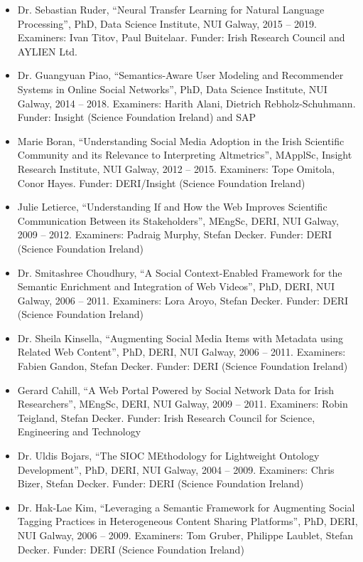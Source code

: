 \documentclass[10pt,a4paper]{res} %
\begin{document}
\begin{resume}
\begin{itemize} \itemsep -2pt
\item Dr. Sebastian Ruder, ``Neural Transfer Learning for Natural Language Processing'', PhD, Data Science Institute, NUI Galway, 2015 -- 2019. Examiners: Ivan Titov, Paul Buitelaar. Funder: Irish Research Council and AYLIEN Ltd. %
\item Dr. Guangyuan Piao, ``Semantics-Aware User Modeling and Recommender Systems in Online Social Networks'', PhD, Data Science Institute, NUI Galway, 2014 -- 2018. Examiners: Harith Alani, Dietrich Rebholz-Schuhmann. Funder: Insight (Science Foundation Ireland) and SAP %
\item Marie Boran, ``Understanding Social Media Adoption in the Irish Scientific Community and its Relevance to Interpreting Altmetrics'', MApplSc, Insight Research Institute, NUI Galway, 2012 -- 2015. Examiners: Tope Omitola, Conor Hayes. Funder: DERI/Insight (Science Foundation Ireland)
\item Julie Letierce, ``Understanding If and How the Web Improves Scientific Communication Between its Stakeholders'', MEngSc, DERI, NUI Galway, 2009 -- 2012. Examiners: Padraig Murphy, Stefan Decker. Funder: DERI (Science Foundation Ireland)
\item Dr. Smitashree Choudhury, ``A Social Context-Enabled Framework for the Semantic Enrichment and Integration of Web Videos'', PhD, DERI, NUI Galway, 2006 -- 2011. Examiners: Lora Aroyo, Stefan Decker. Funder: DERI (Science Foundation Ireland) %
\item Dr. Sheila Kinsella, ``Augmenting Social Media Items with Metadata using Related Web Content'', PhD, DERI, NUI Galway, 2006 -- 2011. Examiners: Fabien Gandon, Stefan Decker. Funder: DERI (Science Foundation Ireland) %
\item Gerard Cahill, ``A Web Portal Powered by Social Network Data for Irish Researchers'', MEngSc, DERI, NUI Galway, 2009 -- 2011. Examiners: Robin Teigland, Stefan Decker. Funder: Irish Research Council for Science, Engineering and Technology
\item Dr. Uldis Bojars, ``The SIOC MEthodology for Lightweight Ontology Development'', PhD, DERI, NUI Galway, 2004 -- 2009. Examiners: Chris Bizer, Stefan Decker. Funder: DERI (Science Foundation Ireland) %
\item Dr. Hak-Lae Kim, ``Leveraging a Semantic Framework for Augmenting Social Tagging Practices in Heterogeneous Content Sharing Platforms'', PhD, DERI, NUI Galway, 2006 -- 2009. Examiners: Tom Gruber, Philippe Laublet, Stefan Decker. Funder: DERI (Science Foundation Ireland) %
\end{itemize}


\end{resume}
\end{document}
